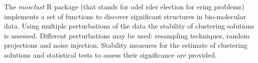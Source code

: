 \documentclass{article}
\begin{document}
\begin{Description}\relax
The \emph{mosclust} R package (that stands for odel rder election for ering problems)
implements a set of functions to discover significant structures in bio-molecular data.
Using multiple perturbations of the data the stability of clustering solutions is assessed. Different
perturbations may be used: resampling techniques, random projections and noise injection. Stability measures
for the estimate of clustering solutions and statistical tests to assess their significance are provided.
\end{Description}
\end{document}
